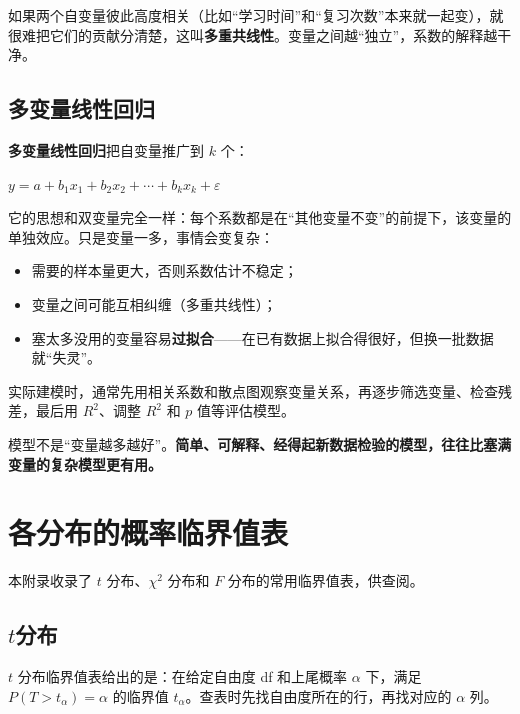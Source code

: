 \documentclass[lang=cn,10pt]{elegantbook}
\begin{document}
\begin{remark}
如果两个自变量彼此高度相关（比如“学习时间”和“复习次数”本来就一起变），就很难把它们的贡献分清楚，这叫\textbf{多重共线性}。变量之间越“独立”，系数的解释越干净。
\end{remark}

\section{多变量线性回归}
\textbf{多变量线性回归}把自变量推广到 $k$ 个：
\begin{center}
$y=a+b_1x_1+b_2x_2+\cdots+b_kx_k+\varepsilon$
\end{center}

它的思想和双变量完全一样：每个系数都是在“其他变量不变”的前提下，该变量的单独效应。只是变量一多，事情会变复杂：
\begin{itemize}
  \item 需要的样本量更大，否则系数估计不稳定；
  \item 变量之间可能互相纠缠（多重共线性）；
  \item 塞太多没用的变量容易\textbf{过拟合}——在已有数据上拟合得很好，但换一批数据就“失灵”。
\end{itemize}

实际建模时，通常先用相关系数和散点图观察变量关系，再逐步筛选变量、检查残差，最后用 $R^2$、调整 $R^2$ 和 $p$ 值等评估模型。

\begin{remark}
模型不是“变量越多越好”。\textbf{简单、可解释、经得起新数据检验的模型，往往比塞满变量的复杂模型更有用。}
\end{remark}








\nocite{*}
\printbibliography[heading=bibintoc, title=\ebibname]
\appendix

\chapter{各分布的概率临界值表}
本附录收录了 $t$ 分布、$\chi^2$ 分布和 $F$ 分布的常用临界值表，供查阅。

\section{$t$分布}
$t$ 分布临界值表给出的是：在给定自由度 df 和上尾概率 $\alpha$ 下，满足 $P(T>t_{\alpha})=\alpha$ 的临界值 $t_{\alpha}$。查表时先找自由度所在的行，再找对应的 $\alpha$ 列。
\end{document}

